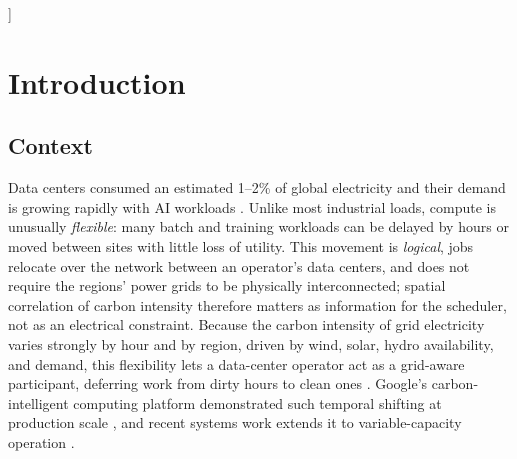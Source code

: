 \documentclass[10pt,twocolumn]{article}
\begin{document}
\begin{@twocolumnfalse}
\begin{abstract}
of the stochastic solution near zero, and pays over deterministic transfer only past
an emergency-severity crossover $M^\star\approx3$ (with $M$ the multiple by which a
region's carbon intensity spikes in a rare grid emergency, so $M=3$ is a tripling);
tested against real data-grounded
worst-tail emergencies across 17 zones, that crossover never activates. The thesis
contributes a working scheduler with honest savings, a screening rule for when
passive dependence modelling fails, and a price-of-robustness decision rule with a
tested, data-grounded bound, all under 202 tests, with the Phase~1--2 falsification protocol pre-committed (the stylised-emergency crossover of RQ3 is a calibrated stress test, not part of the pre-commitment).
    \end{abstract}
    \vspace{1.4em}
  \end{@twocolumnfalse}
]

\section{Introduction}\label{sec:intro}

\subsection{Context}
Data centers consumed an estimated 1--2\% of global electricity and their demand is
growing rapidly with AI workloads \citep{iea2024}. Unlike most industrial loads,
compute is unusually \emph{flexible}: many batch and training workloads can be
delayed by hours or moved between sites with little loss of utility. This movement is
\emph{logical}, jobs relocate over the network between an operator's data centers, and
does not require the regions' power grids to be physically interconnected; spatial
correlation of carbon intensity therefore matters as information for the scheduler, not
as an electrical constraint. Because the
carbon intensity of grid electricity varies strongly by hour and by region, driven by wind, solar, hydro availability, and demand, this flexibility lets a
data-center operator act as a grid-aware participant, deferring work from dirty
hours to clean ones \citep{radovanovic2022,wiesner2021}. Google's carbon-intelligent
computing platform demonstrated such temporal shifting at production scale
\citep{radovanovic2022}, and recent systems work extends it to variable-capacity
operation \citep{wijayawardana2025}.
\end{document}
